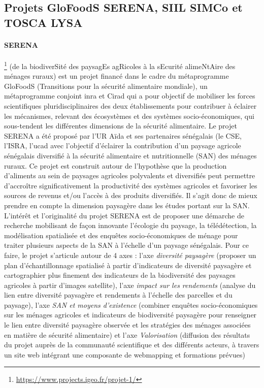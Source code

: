   
  \subsection{Projets GloFoodS SERENA, SIIL SIMCo et TOSCA LYSA}
  
  \paragraph{SERENA}\footnote{\url{https://www.projects.igeo.fr/projet-1/}} (de la biodiverSité des paysagEs agRicoles à la sEcurité alimeNtAire des
ménages ruraux) est un projet financé dans le cadre du métaprogramme GloFoodS
(Transitions pour la sécurité alimentaire mondiale), un métaprogramme conjoint \acrshort{inra} et Cirad qui a pour objectif de mobiliser les forces scientifiques pluridisciplinaires des deux établissements pour contribuer à éclairer les mécanismes, relevant des écosystèmes et des systèmes socio-économiques, qui sous-tendent les différentes dimensions de la sécurité alimentaire. Le projet SERENA a été proposé par l’UR Aïda et
ses partenaires sénégalais (le CSE, l’ISRA, l’\acrshort{ucad} avec l’objectif d’éclairer la contribution d’un paysage agricole sénégalais diversifié à la sécurité alimentaire et nutritionnelle (SAN) des ménages ruraux. Ce projet est construit autour de l’hypothèse
que la production d’aliments au sein de paysages agricoles polyvalents et diversifiés
peut permettre d’accroître significativement la productivité des systèmes agricoles
et favoriser les sources de revenus et/ou l’accès à des produits diversifiés. Il s’agit
donc de mieux prendre en compte la dimension paysagère dans les études portant
sur la SAN. L’intérêt et l’originalité du projet SERENA est de proposer une démarche
de recherche mobilisant de façon innovante l’écologie du paysage, la télédétection,
la modélisation spatialisée et des enquêtes socio-économiques de ménage pour traiter plusieurs aspects de la SAN à l’échelle d’un paysage sénégalais. Pour ce faire, le projet s’articule autour de 4 axes : l’axe \emph{diversité paysagère} (proposer un plan d’échantillonnage spatialisé à partir d’indicateurs de diversité paysagère et cartographier plus
finement des indicateurs de la biodiversité des paysages agricoles à partir d’images
satellite), l’axe \emph{impact sur les rendements} (analyse du lien entre diversité paysagère et
rendements à l’échelle des parcelles et du paysage), l’axe \emph{SAN et moyens d’existence}
(combiner enquêtes socio-économiques sur les ménages agricoles et indicateurs de
biodiversité paysagère pour renseigner le lien entre diversité paysagère observée et
les stratégies des ménages associées en matière de sécurité alimentaire) et l’axe \emph{Valorisation} (diffusion des résultats du projet auprès de la communauté scientifique et des différents acteurs, à travers un site web intégrant une composante de webmapping et
formations prévues)
  
